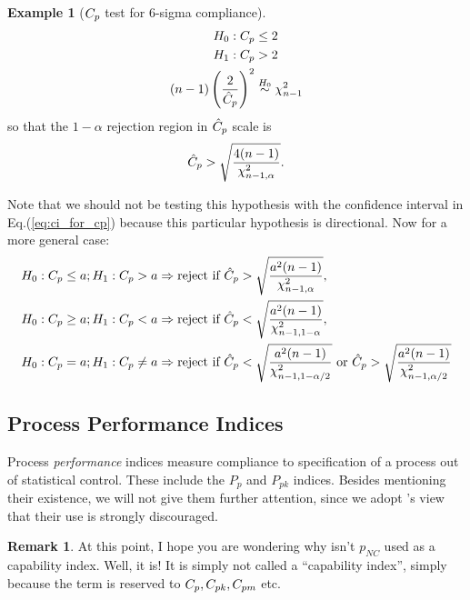 \documentclass[12pt,a4paper]{report}
\theoremstyle{plain}
\theoremstyle{definition}
\newtheorem{remark}{Remark}
\newtheorem{example}{Example}
\newcommand{\pnc}{p_{NC}}
\newcommand{\cpk}{C_{pk}}
\newcommand{\cpm}{C_{pm}}
\newcommand{\pp}{P_{p}}
\newcommand{\ppk}{P_{pk}}
\begin{document}
\begin{example}[$C_p$ test for 6-sigma compliance]
\begin{align*}
	H_0: C_p &\leq 2	\\
	H_1:C_p &> 2 \\
	(n-1) \left( \frac{2}{\hat{C}_p} \right)^2  &\overset{H_0}{\sim} \chi^2_{n-1}
\end{align*}
so that the $1-\alpha$ rejection region in $\hat{C}_p$ scale is 
\begin{align*}
	\hat{C}_p > \sqrt{\frac{4 (n-1)}{\chi^2_{n-1,\alpha}}} .
\end{align*}
\end{example}
Note that we should not be testing this hypothesis with the confidence interval in Eq.(\ref{eq:ci_for_cp}) because this particular hypothesis is directional.
Now for a more general case:
\begin{align*}
	H_0: C_p \leq a; 
	H_1:C_p > a 
	&\Rightarrow \text{reject if } \hat{C}_p > \sqrt{\frac{a^2 (n-1)}{\chi^2_{n-1,\alpha}}},\\
	H_0: C_p \geq  a; 
	H_1:C_p < a 
	&\Rightarrow \text{reject if } \hat{C}_p < \sqrt{\frac{a^2 (n-1)}{\chi^2_{n-1,1-\alpha}}}, \\
	H_0: C_p =  a; 
	H_1:C_p \neq a 
	&\Rightarrow \text{reject if } \hat{C}_p < \sqrt{\frac{a^2 (n-1)}{\chi^2_{n-1,1-\alpha/2}}}
	\text{ or } \hat{C}_p > \sqrt{\frac{a^2 (n-1)}{\chi^2_{n-1,\alpha/2}}} \\
\end{align*}














\subsection{Process Performance Indices}
Process \emph{performance} indices measure compliance to specification of a process out of statistical control. 
These include the $\pp$ and $\ppk$ indices. 
Besides mentioning their existence, we will not give them further attention, since we adopt \cite{montgomery_introduction_2007}'s view that their use is strongly discouraged. 


\begin{remark}
At this point, I hope you are wondering why isn't $\pnc$ used as a capability index. 
Well, it is! 
It is simply not called a ``capability index'', simply because the term is reserved to $\cp, \cpk, \cpm$ etc.
\end{remark}
\end{document}
